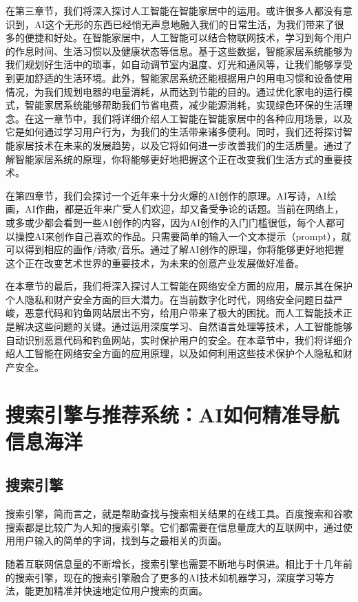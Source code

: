 在第三章节，我们将深入探讨人工智能在智能家居中的运用。或许很多人都没有意识到，AI这个无形的东西已经悄无声息地融入我们的日常生活，为我们带来了很多的便捷和好处。在智能家居中，人工智能可以结合物联网技术，学习到每个用户的作息时间、生活习惯以及健康状态等信息。基于这些数据，智能家居系统能够为我们规划好生活中的琐事，如自动调节室内温度、灯光和通风等，让我们能够享受到更加舒适的生活环境。此外，智能家居系统还能根据用户的用电习惯和设备使用情况，为我们规划电器的电量消耗，从而达到节能的目的。通过优化家电的运行模式，智能家居系统能够帮助我们节省电费，减少能源消耗，实现绿色环保的生活理念。在这一章节中，我们将详细介绍人工智能在智能家居中的各种应用场景，以及它是如何通过学习用户行为，为我们的生活带来诸多便利。同时，我们还将探讨智能家居技术在未来的发展趋势，以及它将如何进一步改善我们的生活质量。通过了解智能家居系统的原理，你将能够更好地把握这个正在改变我们生活方式的重要技术。

在第四章节，我们会探讨一个近年来十分火爆的AI创作的原理。AI写诗，AI绘画，AI作曲，都是近年来广受人们欢迎，却又备受争论的话题。当前在网络上，或多或少都会看到一些AI创作的内容，因为AI创作的入门门槛很低，每个人都可以操控AI来创作自己喜欢的作品。只需要简单的输入一个文本提示（prompt），就可以得到相应的画作/诗歌/音乐。通过了解AI创作的原理，你将能够更好地把握这个正在改变艺术世界的重要技术，为未来的创意产业发展做好准备。

在本章节的最后，我们将深入探讨人工智能在网络安全方面的应用，展示其在保护个人隐私和财产安全方面的巨大潜力。在当前数字化时代，网络安全问题日益严峻，恶意代码和钓鱼网站层出不穷，给用户带来了极大的困扰。而人工智能技术正是解决这些问题的关键。通过运用深度学习、自然语言处理等技术，人工智能能够自动识别恶意代码和钓鱼网站，实时保护用户的安全。在本章节中，我们将详细介绍人工智能在网络安全方面的应用原理，以及如何利用这些技术保护个人隐私和财产安全。

\section[搜索引擎与推荐系统]{搜索引擎与推荐系统：AI如何精准导航信息海洋}

\subsection{搜索引擎}
搜索引擎，简而言之，就是帮助查找与搜索相关结果的在线工具。百度搜索和谷歌搜索都是比较广为人知的搜索引擎。它们都需要在信息量庞大的互联网中，通过使用用户输入的简单的字词，找到与之最相关的页面。

随着互联网信息量的不断增长，搜索引擎也需要不断地与时俱进。相比于十几年前的搜索引擎，现在的搜索引擎融合了更多的AI技术如机器学习，深度学习等方法，能更加精准并快速地定位用户搜索的页面。

